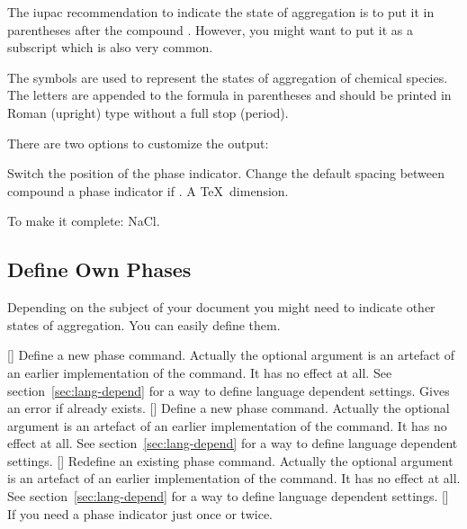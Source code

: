 \documentclass[load-preamble+]{cnltx-doc}
\begin{document}
The \ac{iupac} recommendation to indicate the state of aggregation is to put
it in parentheses after the compound \cite{iupac:greenbook}.  However, you
might want to put it as a subscript which is also very common.

\begin{cnltxquote}
  The \textelp{} symbols are used to represent the states of aggregation of
  chemical species.  The letters are appended to the formula in parentheses
  and should be printed in Roman (upright) type without a full stop (period).
\end{cnltxquote}

There are two options to customize the output:
\begin{options}
    Switch the position of the phase indicator.
  \Default{.1333em}
    Change the default spacing between compound a phase indicator if
    . A \TeX\ dimension.
\end{options}
\begin{example}
  \par
  To make it complete: NaCl\aq.
\end{example}


\subsection{Define Own Phases}
Depending on the subject of your document you might need to indicate other
states of aggregation.  You can easily define them.
\begin{commands}
  []
    Define a new phase command.  Actually the optional
    argument is an artefact of an earlier implementation of the command.  It
    has no effect at all.  See section~\ref{sec:lang-depend} for a way to
    define language dependent settings.  Gives an error if  already
    exists.
  []
    Define a new phase command.  Actually the optional argument is an artefact
    of an earlier implementation of the command.  It has no effect at all.
    See section~\ref{sec:lang-depend} for a way to define language dependent
    settings.
  []
    Redefine an existing phase command.  Actually the optional argument is an
    artefact of an earlier implementation of the command.  It has no effect at
    all.  See section~\ref{sec:lang-depend} for a way to define language
    dependent settings.
  []
    If you need a phase indicator just once or twice.
\end{commands}
\end{document}
